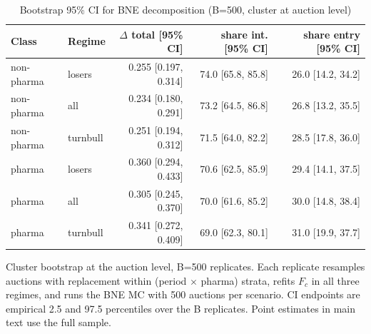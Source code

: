 \begin{table}[htbp]
\centering
\begin{threeparttable}
\caption{Bootstrap 95\% CI for BNE decomposition (B=500, cluster at auction level)}
\label{tab:v3_bootstrap_ci}
\small
\begin{tabular}{llrrr}
\toprule
Class & Regime & $\Delta$ total [95\% CI] & share int. [95\% CI] & share entry [95\% CI] \\
\midrule
non-pharma & losers & 0.255 [0.197, 0.314] & 74.0 [65.8, 85.8] & 26.0 [14.2, 34.2] \\
non-pharma & all & 0.234 [0.180, 0.291] & 73.2 [64.5, 86.8] & 26.8 [13.2, 35.5] \\
non-pharma & turnbull & 0.251 [0.194, 0.312] & 71.5 [64.0, 82.2] & 28.5 [17.8, 36.0] \\
pharma & losers & 0.360 [0.294, 0.433] & 70.6 [62.5, 85.9] & 29.4 [14.1, 37.5] \\
pharma & all & 0.305 [0.245, 0.370] & 70.0 [61.6, 85.2] & 30.0 [14.8, 38.4] \\
pharma & turnbull & 0.341 [0.272, 0.409] & 69.0 [62.3, 80.1] & 31.0 [19.9, 37.7] \\
\bottomrule
\end{tabular}
\begin{tablenotes}\footnotesize
\item Cluster bootstrap at the auction level, B=500 replicates.
Each replicate resamples auctions with replacement within
(period $\times$ pharma) strata, refits $F_c$ in all three
regimes, and runs the BNE MC with 500 auctions per scenario.
CI endpoints are empirical 2.5 and 97.5 percentiles over the
B replicates. Point estimates in main text use the full sample.
\end{tablenotes}
\end{threeparttable}
\end{table}
